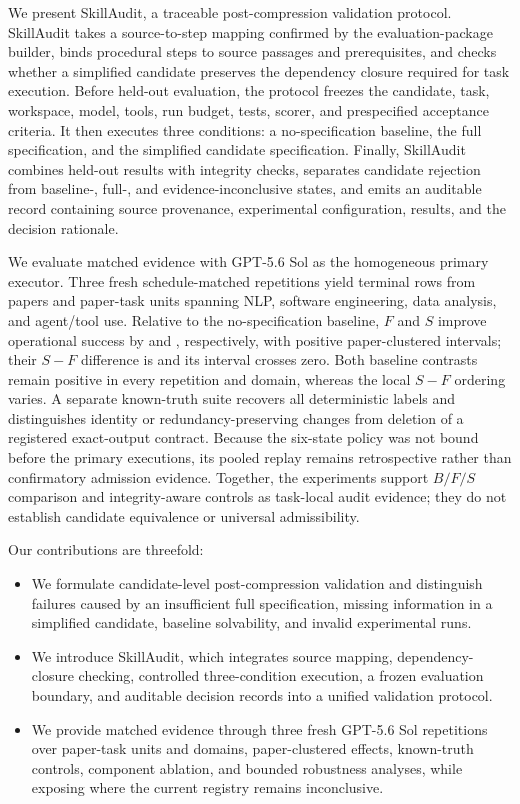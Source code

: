 We present SkillAudit, a traceable post-compression validation protocol. SkillAudit takes a source-to-step mapping confirmed by the evaluation-package builder, binds procedural steps to source passages and prerequisites, and checks whether a simplified candidate preserves the dependency closure required for task execution. Before held-out evaluation, the protocol freezes the candidate, task, workspace, model, tools, run budget, tests, scorer, and prespecified acceptance criteria. It then executes three conditions: a no-specification baseline, the full specification, and the simplified candidate specification. Finally, SkillAudit combines held-out results with integrity checks, separates candidate rejection from baseline-, full-, and evidence-inconclusive states, and emits an auditable record containing source provenance, experimental configuration, results, and the decision rationale.

We evaluate matched evidence with GPT-5.6 Sol as the homogeneous primary executor. Three fresh schedule-matched repetitions yield \PrimaryRows{} terminal rows from \PrimaryPapers{} papers and \PrimaryTasks{} paper-task units spanning NLP, software engineering, data analysis, and agent/tool use. Relative to the no-specification baseline, $F$ and $S$ improve operational success by \FBSuccessEffect{} and \SBSuccessEffect{}, respectively, with positive paper-clustered intervals; their $S-F$ difference is \SFSuccessEffect{} and its interval crosses zero. Both baseline contrasts remain positive in every repetition and domain, whereas the local $S-F$ ordering varies. A separate known-truth suite recovers all \ControlDeterministicCells{} deterministic labels and distinguishes identity or redundancy-preserving changes from deletion of a registered exact-output contract. Because the six-state policy was not bound before the primary executions, its pooled replay remains retrospective rather than confirmatory admission evidence. Together, the experiments support $B/F/S$ comparison and integrity-aware controls as task-local audit evidence; they do not establish candidate equivalence or universal admissibility.

Our contributions are threefold:
\begin{itemize}
    \item We formulate candidate-level post-compression validation and distinguish failures caused by an insufficient full specification, missing information in a simplified candidate, baseline solvability, and invalid experimental runs.
    \item We introduce SkillAudit, which integrates source mapping, dependency-closure checking, controlled three-condition execution, a frozen evaluation boundary, and auditable decision records into a unified validation protocol.
    \item We provide matched evidence through three fresh GPT-5.6 Sol repetitions over \PrimaryTasks{} paper-task units and \PrimaryDomains{} domains, paper-clustered effects, known-truth controls, component ablation, and bounded robustness analyses, while exposing where the current registry remains inconclusive.
\end{itemize}
